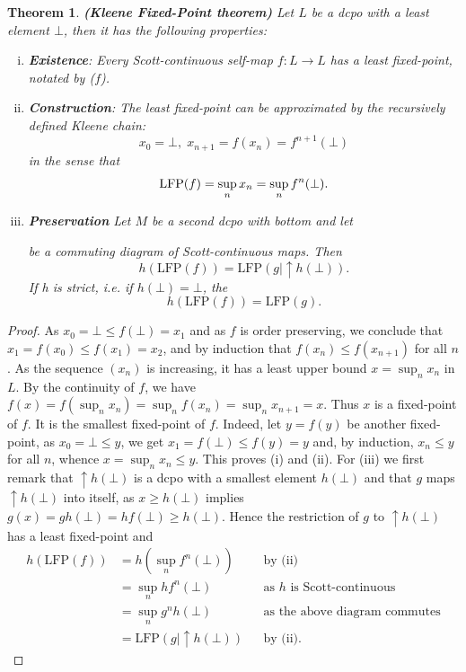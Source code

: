 \documentclass[a4paper,12pt]{article}
\newtheorem{theorem}{Theorem}[section]
\newcommand{\LFP}{\text{LFP}}
\begin{document}
\begin{theorem}\textbf{(Kleene Fixed-Point theorem)} Let $L$ be a dcpo with a least element $\bot$, then it has the following properties:
\begin{enumerate}[(i)]
  \item \textbf{Existence}: Every Scott-continuous self-map $f: L \rightarrow L$ has a least fixed-point, notated by \LFP($f$).
  \item \textbf{Construction}: The least fixed-point can be approximated by the recursively defined \emph{Kleene chain}:
      $$x_0 = \bot, \; x_{n+1} = f(x_n) = f^{n+1}(\bot)$$
      in the sense that
      $$\text{\LFP}(f) = \sup_n x_n = \sup_n f^n(\bot).$$
  \item \textbf{Preservation} Let $M$ be a second dcpo with bottom and let
 \begin{center}
 \end{center}
 be a commuting diagram of Scott-continuous maps. Then
 $$h(\LFP(f)) = \LFP(g | \uparrow h(\bot)).$$
 If h is strict, i.e. if $h(\bot) = \bot$, the
 $$h(\LFP(f)) = \LFP(g).$$
\end{enumerate}
\end{theorem}
\begin{proof}
As $x_0 = \bot \leq f(\bot) = x_1$ and as $f$ is order preserving, we conclude that $x_1 = f(x_0)  \leq f(x_1) = x_2$, and by induction that $f(x_n) \leq f(x_{n+1})$ for all $n$. As the sequence $(x_n)$ is increasing, it has a least upper bound $x = \sup_n x_n$ in $L$. By the continuity of $f$, we have $f(x) = f(\sup_n x_n) = \sup_n f(x_n) = \sup_n x_{n + 1} = x.$ Thus $x$ is a fixed-point of $f$. It is the smallest fixed-point of $f$. Indeed, let $y = f(y)$ be another fixed-point, as $x_0 = \bot \leq y$, we get $x_1 = f(\bot) \leq f(y) = y$ and, by induction, $x_n \leq y$ for all $n$, whence $x = \sup_n x_n \leq y$. This proves (i) and (ii). For (iii) we first remark that $\uparrow h(\bot)$ is a dcpo with a smallest element $h(\bot)$ and that $g$ maps $\uparrow h(\bot)$ into itself, as $x \geq h(\bot)$ implies $g(x) = gh(\bot) = hf(\bot) \geq h(\bot)$. Hence the restriction of $g$ to $\uparrow h(\bot)$ has a least fixed-point and
\begin{align*}
h(\LFP(f)) &= h(\sup_n f^n(\bot))& &\text{by (ii)}\\
&= \sup_n hf^n(\bot)& &\text{as $h$ is Scott-continuous}\\
&= \sup_n g^nh(\bot)&   &\text{as the above diagram commutes}\\
&= \LFP(g | \uparrow h(\bot))&  &\text{by (ii).}
\end{align*}
\end{proof}
\end{document}
